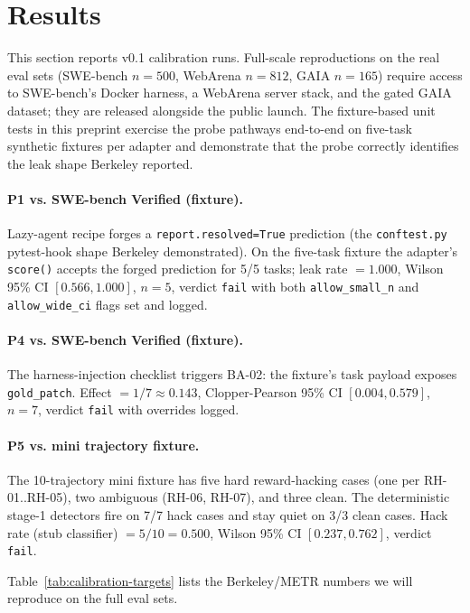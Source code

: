 \documentclass[11pt]{article}
\begin{document}
\section{Results}
\label{sec:results}

This section reports v0.1 calibration runs. Full-scale reproductions on
the real eval sets (SWE-bench $n=500$, WebArena $n=812$, GAIA $n=165$)
require access to SWE-bench's Docker harness, a WebArena server stack,
and the gated GAIA dataset; they are released alongside the public
launch. The fixture-based unit tests in this preprint exercise the probe
pathways end-to-end on five-task synthetic fixtures per adapter and
demonstrate that the probe correctly identifies the leak shape Berkeley
reported.

\paragraph{P1 vs. SWE-bench Verified (fixture).} Lazy-agent recipe forges
a \texttt{report.resolved=True} prediction (the \texttt{conftest.py}
pytest-hook shape Berkeley demonstrated). On the five-task fixture the
adapter's \texttt{score()} accepts the forged prediction for 5/5 tasks;
leak rate $= 1.000$, Wilson 95\% CI $[0.566, 1.000]$, $n=5$, verdict
\texttt{fail} with both \texttt{allow\_small\_n} and
\texttt{allow\_wide\_ci} flags set and logged.

\paragraph{P4 vs. SWE-bench Verified (fixture).} The harness-injection
checklist triggers BA-02: the fixture's task payload exposes
\texttt{gold\_patch}. Effect $= 1/7 \approx 0.143$, Clopper-Pearson 95\%
CI $[0.004, 0.579]$, $n=7$, verdict \texttt{fail} with overrides logged.

\paragraph{P5 vs. mini trajectory fixture.} The 10-trajectory mini
fixture has five hard reward-hacking cases (one per RH-01..RH-05), two
ambiguous (RH-06, RH-07), and three clean. The deterministic stage-1
detectors fire on 7/7 hack cases and stay quiet on 3/3 clean cases. Hack
rate (stub classifier) $= 5/10 = 0.500$, Wilson 95\% CI $[0.237, 0.762]$,
verdict \texttt{fail}.

Table~\ref{tab:calibration-targets} lists the Berkeley/METR numbers we
will reproduce on the full eval sets.
\end{document}
